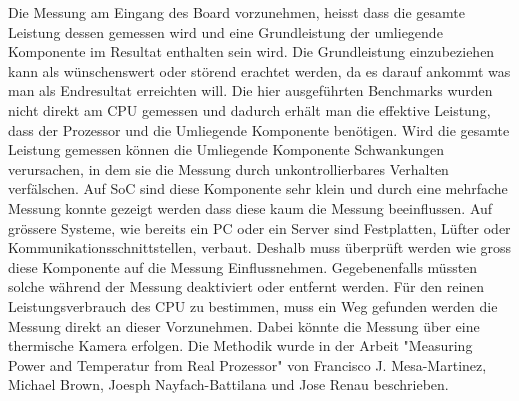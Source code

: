 Die Messung am Eingang des Board vorzunehmen, heisst dass die gesamte Leistung dessen gemessen wird und eine Grundleistung der umliegende Komponente im Resultat enthalten sein wird. Die Grundleistung einzubeziehen kann als wünschenswert oder störend erachtet werden, da es darauf ankommt was man als Endresultat erreichten will. Die hier ausgeführten Benchmarks wurden nicht direkt am CPU gemessen und dadurch erhält man die effektive Leistung, dass der Prozessor und die Umliegende Komponente benötigen. Wird die gesamte Leistung gemessen können die Umliegende Komponente Schwankungen verursachen, in dem sie die Messung durch unkontrollierbares Verhalten verfälschen. Auf SoC sind diese Komponente sehr klein und durch eine mehrfache Messung konnte gezeigt werden dass diese kaum die Messung beeinflussen. Auf grössere Systeme, wie bereits ein PC oder ein Server sind Festplatten, Lüfter oder Kommunikationsschnittstellen, verbaut. Deshalb muss überprüft werden wie gross diese Komponente auf die Messung Einflussnehmen. Gegebenenfalls müssten solche während der Messung deaktiviert oder entfernt werden. Für den reinen Leistungsverbrauch des CPU zu bestimmen, muss ein Weg gefunden werden die Messung direkt an dieser Vorzunehmen. Dabei könnte die Messung über eine thermische Kamera erfolgen. Die Methodik wurde in der Arbeit "Measuring Power and Temperatur from Real Prozessor"\cite{measuring_power_temperature,} von Francisco J. Mesa-Martinez,  Michael Brown, Joesph  Nayfach-Battilana und Jose Renau beschrieben.































